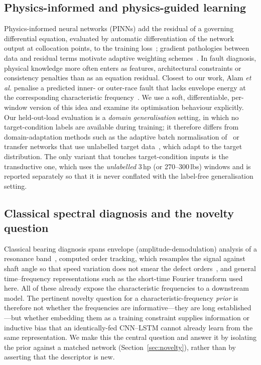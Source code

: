 \documentclass[conference]{IEEEtran}
\begin{document}
\subsection{Physics-informed and physics-guided learning}
Physics-informed neural networks (PINNs) add the residual of a governing
differential equation, evaluated by automatic differentiation of the network
output at collocation points, to the training loss~\cite{raissi2019}; gradient
pathologies between data and residual terms motivate adaptive weighting
schemes~\cite{wang2021,mcclenny2023}. In fault diagnosis, physical knowledge
more often enters as features, architectural constraints or consistency
penalties than as an equation residual. Closest to our work, Alam \emph{et al.}
penalise a predicted inner- or outer-race fault that lacks envelope energy at
the corresponding characteristic frequency~\cite{alam2025}. We use a soft,
differentiable, per-window version of this idea and examine its optimisation
behaviour explicitly. Our held-out-load evaluation is a \emph{domain
generalisation} setting, in which no target-condition labels are available
during training; it therefore differs from domain-adaptation methods such as the
adaptive batch normalisation of~\cite{zhang2017} or transfer networks that use
unlabelled target data~\cite{guo2019}, which adapt to the target distribution.
The only variant that touches target-condition inputs is the transductive one,
which uses the \emph{unlabelled} 3\,hp (or 270--300\,lbs) windows and is reported
separately so that it is never conflated with the label-free generalisation
setting.

\subsection{Classical spectral diagnosis and the novelty question}
Classical bearing diagnosis spans envelope (amplitude-demodulation) analysis of
a resonance band~\cite{randall2011}, computed order tracking, which resamples
the signal against shaft angle so that speed variation does not smear the defect
orders~\cite{fyfe1997}, and general time--frequency representations such as the
short-time Fourier transform used here. All of these already expose the
characteristic frequencies to a downstream model. The pertinent novelty question
for a characteristic-frequency \emph{prior} is therefore not whether the
frequencies are informative---they are long established---but whether embedding
them as a training constraint supplies information or inductive bias that an
identically-fed CNN--LSTM cannot already learn from the same representation. We
make this the central question and answer it by isolating the prior against a
matched network (Section~\ref{sec:novelty}), rather than by asserting that the
descriptor is new.
\end{document}
